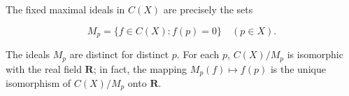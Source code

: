 The fixed maximal ideals in \(C(X)\) are precisely the sets

\[
M_p = \{ f \in C(X) : f(p) = 0 \} \quad (p \in X).
\]

The ideals \(M_p\) are distinct for distinct \(p\). For each \(p\), \(C(X)/M_p\) is isomorphic with the real field \(\mathbf{R}\); in fact, the mapping \(M_p(f) \mapsto f(p)\) is the unique isomorphism of \(C(X)/M_p\) onto \(\mathbf{R}\).
